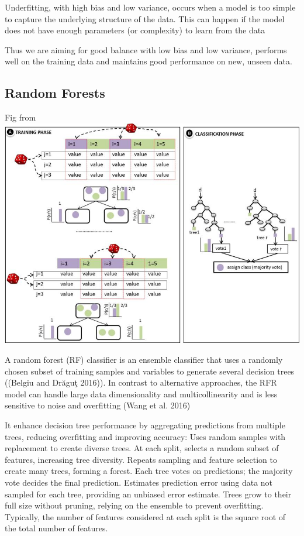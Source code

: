 \documentclass[
  letterpaper,
  DIV=11,
  numbers=noendperiod]{scrreprt}
\begin{document}
Underfitting, with high bias and low variance, occurs when a model is
too simple to capture the underlying structure of the data. This can
happen if the model does not have enough parameters (or complexity) to
learn from the data

Thus we are aiming for good balance with low bias and low variance,
performs well on the training data and maintains good performance on
new, unseen data.

\subsection{Random Forests}\label{random-forests}

Fig from\includegraphics{RF.png}

A random forest (RF) classifier is an ensemble classifier that uses a
randomly chosen subset of training samples and variables to generate
several decision trees ((Belgiu and Drăguţ 2016)). In contrast to
alternative approaches, the RFR model can handle large data
dimensionality and multicollinearity and is less sensitive to noise and
overfitting (Wang et al. 2016)

It enhance decision tree performance by aggregating predictions from
multiple trees, reducing overfitting and improving accuracy: Uses random
samples with replacement to create diverse trees. At each split, selects
a random subset of features, increasing tree diversity. Repeats sampling
and feature selection to create many trees, forming a forest. Each tree
votes on predictions; the majority vote decides the final prediction.
Estimates prediction error using data not sampled for each tree,
providing an unbiased error estimate. Trees grow to their full size
without pruning, relying on the ensemble to prevent overfitting.
Typically, the number of features considered at each split is the square
root of the total number of features.
\end{document}

